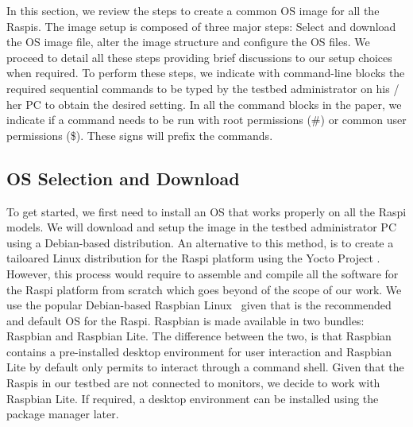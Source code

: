 \label{sec:image_setup}
In this section, we review the steps to create a common \ac{OS} image for
all the \ac{Raspi}s. The image setup is composed of three major steps:
Select and download the \ac{OS} image file, alter the image structure and
configure the \ac{OS} files. We proceed to detail all these steps providing
brief discussions to our setup choices when required. To perform these
steps, we indicate with command-line blocks the required sequential
commands to be typed by the testbed administrator on his / her \ac{PC}
to obtain the desired setting. In all the command blocks in the paper, we indicate if a command needs to be run with root permissions (\#) or common user permissions (\$). These signs will prefix the commands.

\subsection{OS Selection and Download}

To get started, we first need to install an \ac{OS} that works properly
on all the \ac{Raspi} models. We will download and setup the image in
the testbed administrator \ac{PC} using a Debian-based distribution.
An alternative to this method, is to create a tailoared Linux distribution
for the \ac{Raspi} platform using the Yocto Project \cite{yocto}. However, this
process would require to assemble and compile all the software for the
\ac{Raspi} platform from scratch which goes beyond of the scope of our
work. We use the popular Debian-based Raspbian Linux~\cite{raspbian} given
that is the recommended and default \ac{OS} for the \ac{Raspi}. Raspbian is
made available in two bundles: Raspbian and Raspbian Lite. The difference
between the two, is that Raspbian contains a pre-installed desktop environment
for user interaction and Raspbian Lite by default only permits to interact
through a command shell. Given that the \ac{Raspi}s in our testbed are not
connected to monitors, we decide to work with Raspbian Lite.
If required, a desktop environment can be installed using the package manager later.


